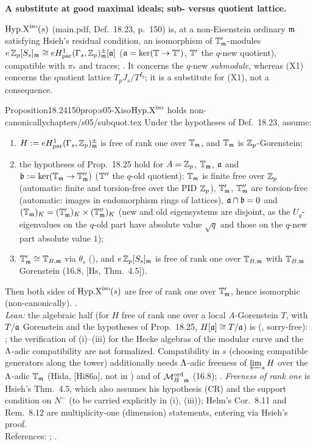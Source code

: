 \medskip\noindent\textbf{A substitute at good maximal ideals; sub- versus quotient lattice.}\par
$\mathrm{Hyp.X}^{\mathrm{iso}}(s)$ (main.pdf, Def.~18.23, p.~150) is, at a non-Eisenstein ordinary $\mathfrak{m}$ satisfying Hsieh's residual condition, an isomorphism of
$\mathbb{T}'_{\mathfrak{m}}$-modules $e\,\mathbb{Z}_p[S_s]_{\mathfrak{m}}\cong eH^1_{\rm par}(\Gamma_s,\mathbb{Z}_p)^\pm_{\mathfrak{m}}[\mathfrak{a}]$ ($\mathfrak{a}=\ker(\mathbb{T}\to\mathbb{T}')$, $\mathbb{T}'$ the $q$-new quotient), compatible with
$\pi_*$ and traces; \sthyp. It concerns the $q$-new \emph{submodule}, whereas (X1) concerns the quotient lattice $T_pJ_s/T^{I_q}$; it is a
substitute for (X1), not a consequence.
\begin{quoted}{Proposition}{18.24}{150}{prop:s05-Xiso}{$\mathrm{Hyp.X}^{\mathrm{iso}}$ holds non-canonically}{chapters/s05/subquot.tex}\label{rpt:prop:s05-Xiso}
Under the hypotheses of Def.~18.23, assume:
\begin{enumerate}[label=(\roman*)]
\item $H:=eH^1_{\rm par}(\Gamma_s,\mathbb{Z}_p)^{\pm}_{\mathfrak{m}}$ is free of rank one over $\mathbb{T}_{\mathfrak{m}}$, and $\mathbb{T}_{\mathfrak{m}}$ is $\mathbb{Z}_p$-Gorenstein;
\item the hypotheses of Prop.~18.25 hold for $A=\mathbb{Z}_p$, $\mathbb{T}_{\mathfrak{m}}$, $\mathfrak{a}$ and $\mathfrak{b}:=\ker(\mathbb{T}_{\mathfrak{m}}\to\mathbb{T}''_{\mathfrak{m}})$ ($\mathbb{T}''$ the $q$-old
  quotient): $\mathbb{T}_{\mathfrak{m}}$ is finite free over $\mathbb{Z}_p$ (automatic: finite and torsion-free over the PID $\mathbb{Z}_p$), $\mathbb{T}'_{\mathfrak{m}}$, $\mathbb{T}''_{\mathfrak{m}}$ are torsion-free
  (automatic: images in endomorphism rings of lattices), $\mathfrak{a}\cap\mathfrak{b}=0$ and $(\mathbb{T}_{\mathfrak{m}})_K=(\mathbb{T}'_{\mathfrak{m}})_K\times(\mathbb{T}''_{\mathfrak{m}})_K$ (new and old
  eigensystems are disjoint, as the $U_q$-eigenvalues on the $q$-old part have absolute value $\sqrt q$ and those on the $q$-new part
  absolute value $1$);
\item $\mathbb{T}'_{\mathfrak{m}}\cong\mathbb{T}_{B,\mathfrak{m}}$ via $\theta_s$ (), and $e\,\mathbb{Z}_p[S_s]_{\mathfrak{m}}$ is free of rank one over $\mathbb{T}_{B,\mathfrak{m}}$ with
  $\mathbb{T}_{B,\mathfrak{m}}$ Gorenstein (16.8, [Hs, Thm.~4.5]).
\end{enumerate}
Then both sides of $\mathrm{Hyp.X}^{\mathrm{iso}}(s)$ are free of rank one over $\mathbb{T}'_{\mathfrak{m}}$, hence isomorphic (non-canonically). \stpmc.\\\emph{Lean:} the algebraic half (for $H$ free of rank one over a local $A$-Gorenstein $T$, with $T/\mathfrak{a}$ Gorenstein and the hypotheses of Prop.~18.25, $H[\mathfrak{a}]\cong T/\mathfrak{a}$) is \stformal{} (, sorry-free): ; the verification of (i)--(iii) for the Hecke algebras of the modular curve and the $\Lambda$-adic compatibility are not formalized.
Compatibility in $s$ (choosing compatible generators along the tower) additionally needs $\Lambda$-adic freeness of $\varprojlim_sH$ over
the $\Lambda$-adic $\mathbb{T}_{\mathfrak{m}}$ (Hida, [Hi86a], not in ) and of ${\mathcal{M}^{\mathrm{ord}}_B}_{\mathfrak{m}}$ (16.8); \stsketch.
\emph{Freeness of rank one} is Hsieh's Thm.~4.5, which also assumes his hypothesis (CR) and the support condition on $N^-$ (to be carried explicitly in (i), (iii)); Helm's Cor.~8.11 and Rem.~8.12 are multiplicity-one (dimension) statements, entering via Hsieh's proof.\\
References: \cite[{Thm.~4.5, p.~34, whose proof cites
[Wil95, Thm.~2.1] and [Hel07, Cor.~8.11, Rem.~8.12]}]{Hs};
\cite[{Cor.~8.11, Remark~8.12, p.~31}]{Hel04}.
\end{quoted}
